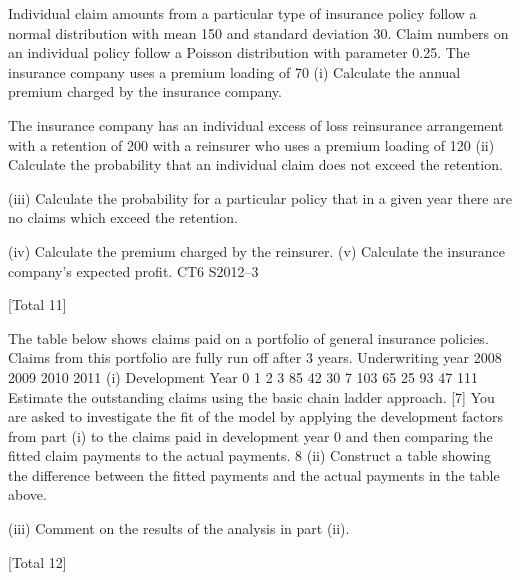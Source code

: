 Individual claim amounts from a particular type of insurance policy follow a normal
distribution with mean 150 and standard deviation 30. Claim numbers on an
individual policy follow a Poisson distribution with parameter 0.25. The insurance
company uses a premium loading of 70%
(i)
Calculate the annual premium charged by the insurance company.

The insurance company has an individual excess of loss reinsurance arrangement with
a retention of 200 with a reinsurer who uses a premium loading of 120%
(ii)
Calculate the probability that an individual claim does not exceed the
retention.

(iii) Calculate the probability for a particular policy that in a given year there are
no claims which exceed the retention.

(iv) Calculate the premium charged by the reinsurer.
(v) Calculate the insurance company’s expected profit.
CT6 S2012–3


[Total 11]



The table below shows claims paid on a portfolio of general insurance policies.
Claims from this portfolio are fully run off after 3 years.
Underwriting year
2008
2009
2010
2011
(i)
Development Year
0
1
2
3
85 42 30 7
103 65 25
93 47
111
Estimate the outstanding claims using the basic chain ladder approach.
[7]
You are asked to investigate the fit of the model by applying the development factors
from part (i) to the claims paid in development year 0 and then comparing the fitted
claim payments to the actual payments.
8
(ii) Construct a table showing the difference between the fitted payments and the
actual payments in the table above.

(iii) Comment on the results of the analysis in part (ii).

[Total 12]


